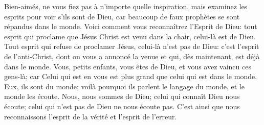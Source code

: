 Bien-aimés, ne vous fiez pas à n’importe quelle inspiration,
	mais examinez les esprits pour voir s’ils sont de Dieu,
	car beaucoup de faux prophètes se sont répandus dans le monde.
Voici comment vous reconnaîtrez l’Esprit de Dieu:
	tout esprit qui proclame que Jésus Christ est venu dans la chair,
	celui-là est de Dieu.
Tout esprit qui refuse de proclamer Jésus, celui-là n’est pas de Dieu:
	c’est l’esprit de l’anti-Christ, dont on vous a annoncé la venue
	et qui, dès maintenant, est déjà dans le monde.
Vous, petits enfants, vous êtes de Dieu, et vous avez vaincu ces gens-là;
	car Celui qui est en vous est plus grand que celui qui est dans le monde.
Eux, ils sont du monde;
	voilà pourquoi ils parlent le langage du monde, et le monde les écoute.
Nous, nous sommes de Dieu;
	celui qui connaît Dieu nous écoute;
	celui qui n’est pas de Dieu ne nous écoute pas.
C’est ainsi que nous reconnaissons l’esprit de la vérité
	et l’esprit de l’erreur.
